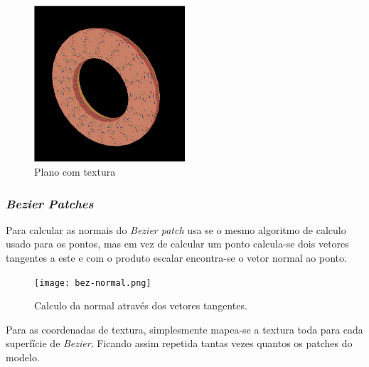 \documentclass[a4paper]{article}
\begin{document}
\begin{figure}[H]
    \centering
    \includegraphics[width=0.5\textwidth]{torus.png}
    \caption{Plano com textura}
\end{figure}

\subsubsection{\textit{Bezier Patches}}

Para calcular as normais do \textit{Bezier patch} usa se o mesmo algoritmo de
calculo usado para os pontos, mas em vez de calcular um ponto calcula-se dois
vetores tangentes a este e com o produto escalar encontra-se o vetor normal ao
ponto.

\begin{figure}[H]
    \centering
    \texttt{[image: bez-normal.png]}
    \caption{Calculo da normal através dos vetores tangentes.}
\end{figure}

Para as coordenadas de textura, simplesmente mapea-se a textura toda para cada
superfície de \textit{Bezier}. Ficando assim repetida tantas vezes quantos os
patches do modelo.
\end{document}
